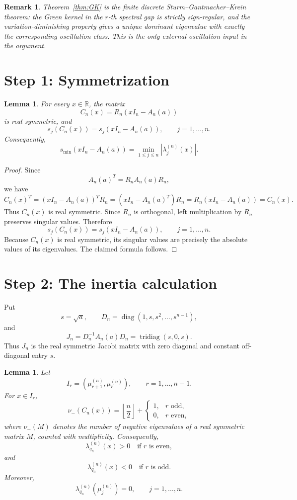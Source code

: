 \documentclass[11pt]{article}
\newtheorem{lemma}[theorem]{Lemma}
\newtheorem{remark}[theorem]{Remark}
\DeclareMathOperator{\diag}{diag}
\begin{document}
\begin{remark}
Theorem~\ref{thm:GK} is the finite discrete Sturm--Gantmacher--Krein theorem:
the Green kernel in the $r$-th spectral gap is strictly sign-regular, and the
variation-diminishing property gives a unique dominant eigenvalue with exactly
the corresponding oscillation class.  This is the only external oscillation
input in the argument.
\end{remark}

\section*{Step 1: Symmetrization}

\begin{lemma}\label{lem:symmetric}
For every $x\in\mathbb R$, the matrix
\[
C_n(x)=R_n(xI_n-A_n(a))
\]
is real symmetric, and
\[
s_j(C_n(x))=s_j(xI_n-A_n(a)),\qquad j=1,\ldots,n.
\]
Consequently,
\[
s_{\min}(xI_n-A_n(a))
=
\min_{1\leq j\leq n}\left|\lambda_j^{(n)}(x)\right|.
\]
\end{lemma}

\begin{proof}
Since
\[
A_n(a)^T=R_nA_n(a)R_n,
\]
we have
\[
C_n(x)^T
=
(xI_n-A_n(a))^TR_n
=(xI_n-A_n(a)^T)R_n
=R_n(xI_n-A_n(a))
=C_n(x).
\]
Thus $C_n(x)$ is real symmetric.  Since $R_n$ is orthogonal, left
multiplication by $R_n$ preserves singular values.  Therefore
\[
s_j(C_n(x))=s_j(xI_n-A_n(a)),\qquad j=1,\ldots,n.
\]
Because $C_n(x)$ is real symmetric, its singular values are precisely the
absolute values of its eigenvalues.  The claimed formula follows.
\end{proof}

\section*{Step 2: The inertia calculation}

Put
\[
s=\sqrt a,
\qquad
D_n=\diag(1,s,s^2,\ldots,s^{n-1}),
\]
and
\[
J_n=D_n^{-1}A_n(a)D_n
=
\operatorname{tridiag}(s,0,s).
\]
Thus $J_n$ is the real symmetric Jacobi matrix with zero diagonal and constant
off-diagonal entry $s$.

\begin{lemma}\label{lem:inertia}
Let
\[
I_r=(\mu_{r+1}^{(n)},\mu_r^{(n)}),
\qquad r=1,\ldots,n-1.
\]
For $x\in I_r$,
\[
\nu_-(C_n(x))
=
\left\lfloor\frac n2\right\rfloor
+
\begin{cases}
1,& r\text{ odd},\\
0,& r\text{ even},
\end{cases}
\]
where $\nu_-(M)$ denotes the number of negative eigenvalues of a real symmetric
matrix $M$, counted with multiplicity.  Consequently,
\[
\lambda_{q_n}^{(n)}(x)>0\quad\text{if }r\text{ is even},
\]
and
\[
\lambda_{q_n}^{(n)}(x)<0\quad\text{if }r\text{ is odd}.
\]
Moreover,
\[
\lambda_{q_n}^{(n)}(\mu_j^{(n)})=0,
\qquad j=1,\ldots,n.
\]
\end{lemma}
\end{document}
